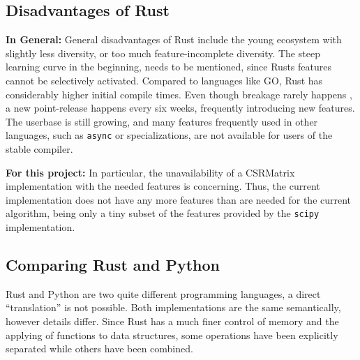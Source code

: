 




\subsection{Disadvantages of Rust}\label{sec:RustDisadvantages}


\textbf{In General:} General disadvantages of Rust include the young ecosystem
with slightly less diversity, or too much feature-incomplete diversity. The
steep learning curve in the beginning, needs to be mentioned, since Rusts
features cannot be selectively activated. Compared to languages like GO, Rust
has considerably higher initial compile times. Even though breakage rarely
happens \cite{rustupdate}, a new point-release happens every six weeks,
frequently introducing new features. The userbase is still growing, and many
features frequently used in other languages, such as \verb|async| or
specializations, are not available for users of the stable compiler.

\textbf{For this project:} In particular, the unavailability of a CSRMatrix
implementation with the needed features is concerning. Thus, the current
implementation does not have any more features than are needed for the current
algorithm, being only a tiny subset of the features provided by the
\verb|scipy| implementation.



\subsection{Comparing Rust and Python}\label{sec:rustvspython}

Rust and Python are two quite different programming languages, a direct
``translation'' is not possible. Both implementations are the same semantically,
however details differ. Since Rust has a much finer control of memory and the
applying of functions to data structures, some operations have been explicitly
separated while others have been combined.

